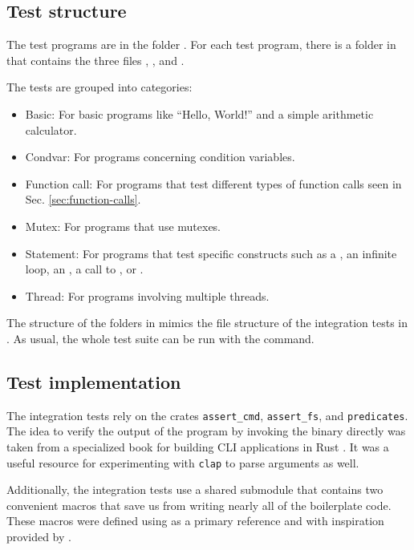 \subsection{Test structure}

The test programs are in the folder .
For each test program, there is a folder in 
that contains the three files
, , and .

The tests are grouped into categories:

\begin{itemize}
    \item Basic: For basic programs like ``Hello, World!'' and a simple arithmetic calculator.
    \item Condvar: For programs concerning condition variables.
    \item Function call: For programs that test different types
          of function calls seen in Sec. \ref{sec:function-calls}.
    \item Mutex: For programs that use mutexes.
    \item Statement: For programs that test specific constructs such as a ,
          an infinite loop, an , a call to ,
          or .
    \item Thread: For programs involving multiple threads.
\end{itemize}

The structure of the folders in  mimics the file structure
of the integration tests in .
As usual, the whole test suite can be run with the  command.

\subsection{Test implementation}

The integration tests rely on the crates \texttt{assert\_cmd}, \texttt{assert\_fs},
and \texttt{predicates}.
The idea to verify the output of the program by invoking the binary directly was
taken from a specialized book for building \acrshort{CLI} applications in Rust \cite[Chap. 1.6]{rust-cli-book}.
It was a useful resource for experimenting with \texttt{clap} to parse arguments as well.

Additionally, the integration tests use a shared submodule \cite[Chap. 11.3]{rust-book}
that contains two convenient macros that save us from writing nearly all of the boilerplate code.
These macros were defined using \cite{rust-macros} as a primary reference
and with inspiration provided by \cite{oaten2023}.

